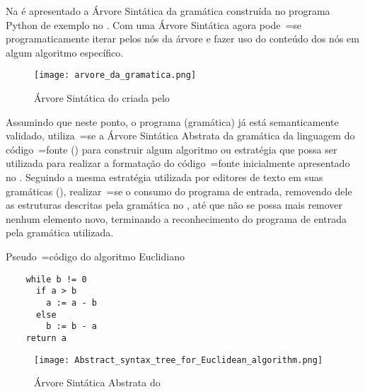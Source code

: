 Na  é apresentado a Árvore Sintática da gramática construída no programa Python de exemplo no .
Com uma Árvore Sintática agora pode~=se programaticamente iterar pelos nós da árvore e
fazer uso do conteúdo dos nós em algum algoritmo específico.
\begin{figure}[H]
\caption{Árvore Sintática do  criada pelo }
\label{figure:arvoreSintaticaDaGramaticaDaMetagramatica}
\centering
\texttt{[image: arvore\_da\_gramatica.png]}
\end{figure}

Assumindo que neste ponto,
o programa (gramática) já está semanticamente validado,
utiliza~=se a Árvore Sintática Abstrata da gramática da linguagem do código~=fonte () para construir algum algoritmo ou
estratégia que possa ser utilizada para realizar a formatação do código~=fonte inicialmente apresentado no .
Seguindo a mesma estratégia utilizada por editores de texto em suas gramáticas (),
realizar~=se o consumo do programa de entrada,
removendo dele as estruturas descritas pela gramática no ,
até que não se possa mais remover nenhum elemento novo,
terminando a reconhecimento do programa de entrada pela gramática utilizada.
\ifadvisor
\else
    \begin{code}
    \caption{Pseudo~=código do algoritmo Euclidiano \cite{analysisOfTheBinaryEuclideanAlgorithm}}
    \label{code:Abstract_syntax_tree_for_Euclidean_algorithm}
    \begin{verbatim}
    while b != 0
      if a > b
        a := a - b
      else
        b := b - a
    return a
    \end{verbatim}
    \end{code}

    \begin{figure}[!htb]
    \caption{Árvore Sintática Abstrata do }
    \label{figure:Abstract_syntax_tree_for_Euclidean_algorithm}
    \centering
    \texttt{[image: Abstract\_syntax\_tree\_for\_Euclidean\_algorithm.png]}
    \end{figure}
\fi


